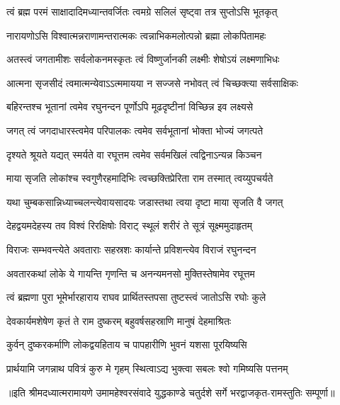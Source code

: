 

\addtocounter{shlokacount}{9}

\twolineshloka
{त्वं ब्रह्म परमं साक्षादादिमध्यान्तवर्जितः}
{त्वमग्रे सलिलं सृष्ट्वा तत्र सुप्तोऽसि भूतकृत्} %

\twolineshloka
{नारायणोऽसि विश्वात्मन्नराणामन्तरात्मकः}
{त्वन्नाभिकमलोत्पन्नो ब्रह्मा लोकपितामहः} %

\twolineshloka
{अतस्त्वं जगतामीशः सर्वलोकनमस्कृतः}
{त्वं विष्णुर्जानकी लक्ष्मीः शेषोऽयं लक्ष्मणाभिधः} %

\twolineshloka
{आत्मना सृजसीदं त्वमात्मन्येवाऽऽत्ममायया}
{न सज्जसे नभोवत् त्वं चिच्छक्त्या सर्वसाक्षिकः} %

\twolineshloka
{बहिरन्तश्च भूतानां त्वमेव रघुनन्दन}
{पूर्णोऽपि मूढदृष्टीनां विच्छिन्न इव लक्ष्यसे} %

\twolineshloka
{जगत् त्वं जगदाधारस्त्वमेव परिपालकः}
{त्वमेव सर्वभूतानां भोक्ता भोज्यं जगत्पते} %

\twolineshloka
{दृश्यते श्रूयते यद्यत् स्मर्यते वा रघूत्तम}
{त्वमेव सर्वमखिलं त्वद्विनाऽन्यन्न किञ्चन} %

\twolineshloka
{माया सृजति लोकांश्च स्वगुणैरहमादिभिः}
{त्वच्छक्तिप्रेरिता राम तस्मात् त्वय्युपचर्यते} %

\twolineshloka
{यथा चुम्बकसान्निध्याच्चलन्त्येवायसादयः}
{जडास्तथा त्वया दृष्टा माया सृजति वै जगत्} %

\twolineshloka
{देहद्वयमदेहस्य तव विश्वं रिरक्षिषोः}
{विराट् स्थूलं शरीरं ते सूत्रं सूक्ष्ममुदाहृतम्} %

\twolineshloka
{विराजः सम्भवन्त्येते अवताराः सहस्रशः}
{कार्यान्ते प्रविशन्त्येव विराजं रघुनन्दन} %

\twolineshloka
{अवतारकथां लोके ये गायन्ति गृणन्ति च}
{अनन्यमनसो मुक्तिस्तेषामेव रघूत्तम} %

\twolineshloka
{त्वं ब्रह्मणा पुरा भूमेर्भारहाराय राघव}
{प्रार्थितस्तपसा तुष्टस्त्वं जातोऽसि रघोः कुले} %

\twolineshloka
{देवकार्यमशेषेण कृतं ते राम दुष्करम्}
{बहुवर्षसहस्राणि मानुषं देहमाश्रितः} %

\twolineshloka
{कुर्वन् दुष्करकर्माणि लोकद्वयहिताय च}
{पापहारीणि भुवनं यशसा पूरयिष्यसि} %

\twolineshloka
{प्रार्थयामि जगन्नाथ पवित्रं कुरु मे गृहम्}
{स्थित्वाऽद्य भुक्त्वा सबलः श्वो गमिष्यसि पत्तनम्} %


{॥इति श्रीमदध्यात्मरामायणे उमामहेश्वरसंवादे युद्धकाण्डे चतुर्दशे  सर्गे
भरद्वाजकृत-रामस्तुतिः सम्पूर्णा॥}
